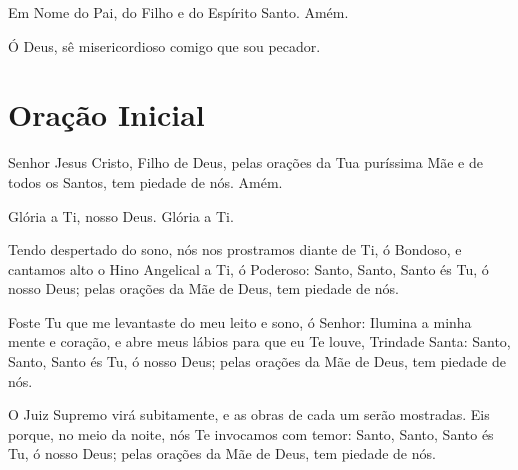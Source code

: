 \documentclass{subfiles}
\begin{document}
\pagestyle{empty}
{\centering}
\pagestyle{headings}

 
Em Nome do Pai, do Filho e do Espírito Santo. Amém. 
 
 
Ó Deus, sê misericordioso comigo que sou pecador. 

\section*{Oração Inicial}

Senhor Jesus Cristo, Filho de Deus, pelas orações da Tua puríssima Mãe 
e de todos os Santos, tem piedade de nós. Amém. 
 
Glória a Ti, nosso Deus. Glória a Ti. 
 
\comforter{}
 
\trisagion{} \thrice{}

\Doxology{}

\holytrinity{}
 
\mercy{} \thrice{}

\Doxology{}
 
\ourFather{}


Tendo despertado do sono, nós nos prostramos diante de Ti, ó 
Bondoso, e cantamos alto o Hino Angelical a Ti, ó Poderoso: Santo, Santo, Santo 
és Tu, ó nosso Deus; pelas orações da Mãe de Deus, tem piedade de nós. 
 
\doxology{}

Foste Tu que me levantaste do meu leito e sono, ó Senhor: Ilumina a minha mente
e coração, e abre meus lábios para que eu Te louve, Trindade Santa: Santo, Santo,
Santo és Tu, ó nosso Deus; pelas orações da Mãe de Deus, tem piedade de nós. 
 
\nowandever{}

O Juiz Supremo virá subitamente, e as obras de cada um serão mostradas. Eis
porque, no meio da noite, nós Te invocamos com temor: Santo, Santo, Santo és Tu,
ó nosso Deus; pelas orações da Mãe de Deus, tem piedade de nós.
\end{document}
